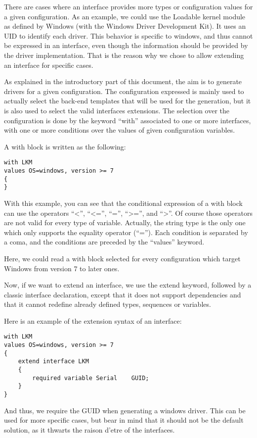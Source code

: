 \documentclass[american]{rtxreport}
\begin{document}
There are cases where an interface provides more types or configuration values
for a given configuration. As an example, we could use the Loadable kernel
module as defined by Windows (with the Windows Driver Development Kit). It uses
an UID to identify each driver. This behavior is specific to windows, and thus
cannot be expressed in an interface, even though the information should be
provided by the driver implementation. That is the reason why we chose to allow
extending an interface for specific cases.

As explained in the introductory part of this document, the aim is to generate
drivers for a given configuration. The configuration expressed is mainly used
to actually select the back-end templates that will be used for the generation,
but it is also used to select the valid interfaces extensions. The selection
over the configuration is done by the keyword ``with'' associated to one or
more interfaces, with one or more conditions over the values of given
configuration variables.

A with block is written as the following:
\begin{lstlisting}
with LKM
values OS=windows, version >= 7
{
}
\end{lstlisting}

With this example, you can see that the conditional expression of a with block
can use the operators ``<'', ``<='', ``='', ``>='', and ``>''. Of course those
operators are not valid for every type of variable. Actually, the string type
is the only one which only supports the equality operator (``=''). Each
condition is separated by a coma, and the conditions are preceded by the
``values'' keyword.

Here, we could read a with block selected for every configuration which target
Windows from version 7 to later ones.

Now, if we want to extend an interface, we use the extend keyword, followed by
a classic interface declaration, except that it does not support dependencies
and that it cannot redefine already defined types, sequences or variables.

Here is an example of the extension syntax of an interface:
\begin{lstlisting}
with LKM
values OS=windows, version >= 7
{
    extend interface LKM
    {
        required variable Serial    GUID;
    }
}
\end{lstlisting}

And thus, we require the GUID when generating a windows driver. This can be
used for more specific cases, but bear in mind that it should not be the
default solution, as it thwarts the raison d'etre of the interfaces.
\end{document}
